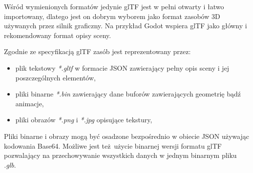 Wśród wymienionych formatów jedynie glTF jest w pełni otwarty i łatwo importowany, dlatego jest on dobrym wyborem jako format zasobów 3D używanych przez silnik graficzny. Na przykład Godot \cite{godotengine} wspiera glTF jako główny i rekomendowany format opisy sceny.

Zgodnie ze specyfikacją glTF \cite{GLTFSPEC} zasób jest reprezentowany przez:
\begin{itemize}
	\item plik tekstowy \textit{*.gltf} w formacie JSON zawierający pełny opis sceny i jej poszczególnych elementów,
	\item pliki binarne \textit{*.bin} zawierający dane buforów zawierających geometrię bądź animacje,
	\item pliki obrazów \textit{*.png} i \textit{*.jpg} opisujące tekstury,
\end{itemize}
Pliki binarne i obrazy mogą być osadzone bezpośrednio w obiecie JSON używając kodowania Base64.
Możliwe jest też użycie binarnej wersji formatu glTF pozwalający na przechowywanie wszystkich danych w jednym binarnym pliku \textit{.glb}.

